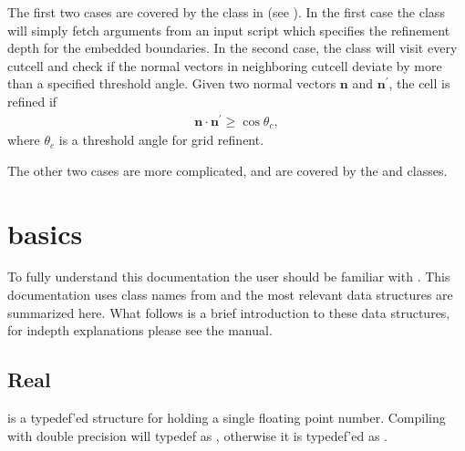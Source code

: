 \documentclass[letterpaper,10pt,english]{sphinxmanual}
\begin{document}
The first two cases are covered by the  class in  (see {\hyperref[\detokenize{Source/Driver:chap-driver}]{}}).
In the first case the  class will simply fetch arguments from an input script which specifies the refinement depth for the embedded boundaries.
In the second case, the  class will visit every cut\sphinxhyphen{}cell and check if the normal vectors in neighboring cut\sphinxhyphen{}cell deviate by more than a specified threshold angle.
Given two normal vectors \(\mathbf{n}\) and \(\mathbf{n}^\prime\), the cell is refined if
\begin{equation*}
\begin{split}\mathbf{n}\cdot\mathbf{n}^\prime \geq \cos\theta_c,\end{split}
\end{equation*}
where \(\theta_c\) is a threshold angle for grid refinent.

The other two cases are more complicated, and are covered by the {\hyperref[\detokenize{Source/GeoCoarsener:chap-geocoarsener}]{}} and {\hyperref[\detokenize{Source/CellTagger:chap-celltagger}]{}} classes.


\section{ basics}
\label{\detokenize{Source/ChomboBasics:chombo-3-basics}}\label{\detokenize{Source/ChomboBasics:chap-basics}}\label{\detokenize{Source/ChomboBasics::doc}}
To fully understand this documentation the user should be familiar with .
This documentation uses class names from  and the most relevant  data structures are summarized here.
What follows is a  brief introduction to these data structures, for in\sphinxhyphen{}depth explanations please see the  manual.


\subsection{Real}
\label{\detokenize{Source/ChomboBasics:real}}
 is a typedef’ed structure for holding a single floating point number.
Compiling with double precision will typedef  as , otherwise it is typedef’ed as .
\end{document}
